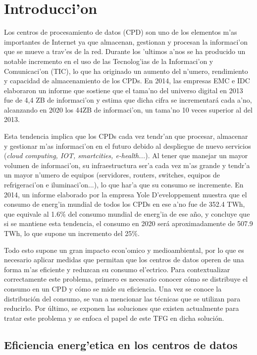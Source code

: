\chapter{Introducci'on}\label{cap:intro}
\normalsize
\thispagestyle{plain}

	Los centros de procesamiento de datos (CPD) son uno de los elementos m'as importantes de Internet ya que almacenan, gestionan y procesan la informaci'on que se mueve a trav'es de la red. Durante los 'ultimos a'nos se ha producido un notable incremento en el uso de las Tecnolog'ias de la Informaci'on y Comunicaci'on (TIC), lo que ha originado un aumento del n'umero, rendimiento y capacidad de almacenamiento de los CPDs. En 2014, las empresas EMC e IDC elaboraron un informe \cite{EMC} que sostiene que el tama'no del universo digital en 2013 fue de 4,4 ZB de informaci'on y estima que dicha cifra se incrementará cada a'no, alcanzando en 2020 los 44ZB de informaci'on, un tama'no 10 veces superior al del 2013.
	
	Esta tendencia implica que los CPDs cada vez tendr'an que procesar, almacenar y gestionar m'as informaci'on en el futuro debido al despliegue de nuevo servicios (\textit{cloud computing, IOT, smartcities, e-health...}). Al tener que manejar un mayor volumen de informaci'on, su infraestructura ser'a cada vez m'as grande y tendr'a un mayor n'umero de equipos (servidores, routers, switches, equipos de refrigeraci'on e iluminaci'on...), lo que har'a que su consumo se incremente. En 2014, un informe elaborado por la empresa Yole D'eveloppement \cite{yole} muestra que el consumo de energ'ia mundial de todos los CPDs en ese a'no fue de 352.4 TWh, que equivale al 1.6\% del consumo mundial de energ'ia de ese año, y concluye que si se mantiene esta tendencia, el consumo en 2020 será aproximadamente de 507.9 TWh, lo que supone un incremento del 25\%.

	Todo esto supone un gran impacto econ'omico y medioambiental, por lo que es necesario aplicar medidas que permitan que los centros de datos operen de una forma m'as eficiente y reduzcan su consumo el'ectrico. Para contextualizar correctamente este problema, primero es necesario conocer cómo se distribuye el consumo en un CPD y cómo se mide su eficiencia. Una vez se conoce la distribución del consumo, se van a mencionar las técnicas que se utilizan para reducirlo. Por último, se exponen las soluciones que existen actualmente para tratar este problema y se enfoca el papel de este TFG en dicha solución.

\section{Eficiencia energ'etica en los centros de datos}\label{sec.situacionactual}

